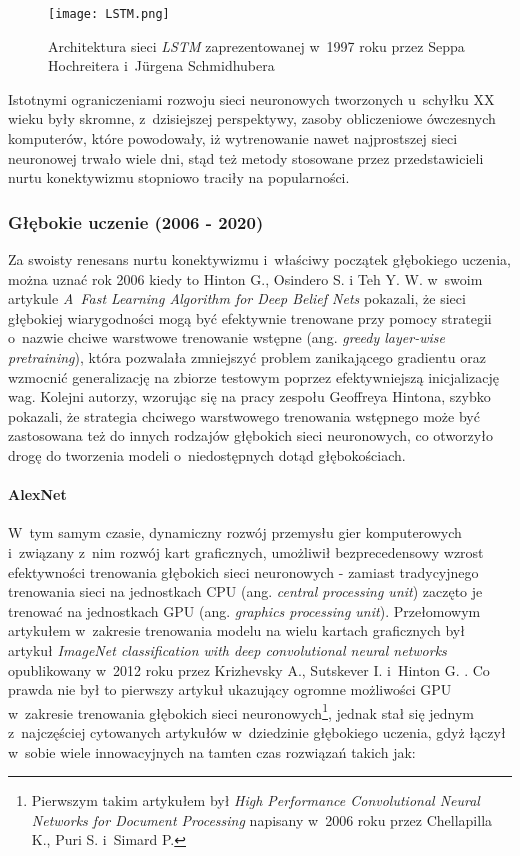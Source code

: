\begin{figure}[!h]
    \centering \texttt{[image: LSTM.png]}
    \captionsetup{format=hang}
    \caption{Architektura sieci \emph{LSTM} zaprezentowanej w~1997 roku przez Seppa Hochreitera i~Jürgena Schmidhubera \cite{hochreiter}}
    \label{fig:lstm1}
\end{figure}

Istotnymi ograniczeniami rozwoju sieci neuronowych tworzonych u~schyłku XX wieku były skromne, z~dzisiejszej perspektywy, zasoby obliczeniowe ówczesnych komputerów, które powodowały, iż wytrenowanie nawet najprostszej sieci neuronowej trwało wiele dni, stąd też metody stosowane przez przedstawicieli nurtu konektywizmu stopniowo traciły na popularności. 

\subsubsection{Głębokie uczenie (2006 - 2020)}

Za swoisty renesans nurtu konektywizmu i~właściwy początek głębokiego uczenia, można uznać rok 2006 kiedy to Hinton G., Osindero S. i Teh Y. W. w~swoim artykule \emph{A~Fast Learning Algorithm for Deep Belief Nets} \cite{hinton} pokazali, że sieci głębokiej wiarygodności mogą być efektywnie trenowane przy pomocy strategii o~nazwie chciwe warstwowe trenowanie wstępne (ang. \emph{greedy layer-wise pretraining}), która pozwalała zmniejszyć problem zanikającego gradientu oraz wzmocnić generalizację na zbiorze testowym poprzez efektywniejszą inicjalizację wag. Kolejni autorzy, wzorując się na pracy zespołu Geoffreya Hintona, szybko pokazali, że strategia chciwego warstwowego trenowania wstępnego może być zastosowana też do innych rodzajów głębokich sieci neuronowych, co otworzyło drogę do tworzenia modeli o~niedostępnych dotąd głębokościach.

\paragraph*{AlexNet}

W~tym samym czasie, dynamiczny rozwój przemysłu gier komputerowych i~związany z~nim rozwój kart graficznych, umożliwił bezprecedensowy wzrost efektywności trenowania głębokich sieci neuronowych - zamiast tradycyjnego trenowania sieci na jednostkach CPU (ang. \emph{central processing unit}) zaczęto je trenować na jednostkach GPU (ang. \emph{graphics processing unit}). Przełomowym artykułem w~zakresie trenowania modelu na wielu kartach graficznych był artykuł \emph{ImageNet classification with deep convolutional neural networks} opublikowany w~2012 roku przez Krizhevsky A., Sutskever I.  i~Hinton G. \cite{alexnet}. Co prawda nie był to pierwszy artykuł ukazujący ogromne możliwości GPU w~zakresie trenowania głębokich sieci neuronowych\footnote{Pierwszym takim artykułem był \emph{High Performance Convolutional Neural Networks for Document Processing} napisany w~2006 roku przez Chellapilla K., Puri S. i~Simard P.}, jednak stał się jednym z~najczęściej cytowanych artykułów w~dziedzinie głębokiego uczenia, gdyż łączył w~sobie wiele innowacyjnych na tamten czas rozwiązań takich jak:

